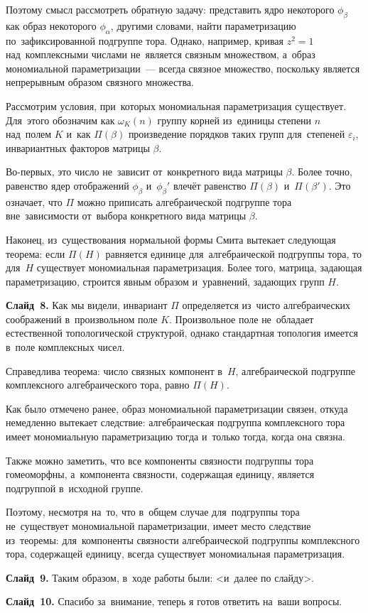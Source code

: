 \documentclass{article}
\begin{document}
  Поэтому смысл рассмотреть обратную задачу: представить ядро некоторого $\phi_\beta$ как образ некоторого $\phi_\alpha$,
  другими словами, найти параметризацию по~зафиксированной подгруппе тора. Однако, например, кривая $z^2 = 1$ над~комплексными числами
  не~является связным множеством, а~образ мономиальной параметризации~— всегда связное множество, поскольку является непрерывным
  образом связного множества.

  Рассмотрим условия, при~которых мономиальная параметризация существует. Для~этого обозначим как $\omega_K(n)$ группу корней из~единицы
  степени $n$ над~полем $K$ и~как $\Pi(\beta)$ произведение порядков таких групп для~степеней $\varepsilon_i$, инвариантных факторов матрицы $\beta$.

  Во-первых, это число не~зависит от~конкретного вида матрицы $\beta$. Более точно, равенство ядер отображений $\phi_\beta$ и~$\phi_\beta'$
  влечёт равенство $\Pi(\beta)$ и~$\Pi(\beta')$. Это означает, что $\Pi$ можно приписать алгебраической подгруппе тора вне~зависимости
  от~выбора конкретного вида матрицы $\beta$.

  Наконец, из~существования нормальной формы Смита вытекает следующая теорема: если $\Pi(H)$ равняется единице для~алгебраической подгруппы
  тора, то для~$H$ существует мономиальная параметризация. Более того, матрица, задающая параметризацию, строится явным образом и~уравнений,
  задающих групп $H$.

  \textbf{Слайд~8.} Как мы видели, инвариант $\Pi$ определяется из~чисто алгебраических соображений в~произвольном поле $K$.
  Произвольное поле не~обладает естественной топологической структурой, однако стандартная топология имеется в~поле комплексных чисел.

  Справедлива теорема: число связных компонент в~$H$, алгебраической подгруппе комплексного алгебраического тора, равно $\Pi(H)$.

  Как было отмечено ранее, образ мономиальной параметризации связен, откуда немедленно вытекает следствие:
  алгебраическая подгруппа комплексного тора имеет мономиальную параметризацию тогда и~только тогда,
  когда она связна.

  Также можно заметить, что все компоненты связности подгруппы тора гомеоморфны, а~компонента связности,
  содержащая единицу, является подгруппой в~исходной группе.

  Поэтому, несмотря на~то, что в~общем случае для~подгруппы тора не~существует мономиальной параметризации,
  имеет место следствие из~теоремы: для~компоненты связности алгебраической подгруппы комплексного тора, содержащей
  единицу, всегда существует мономиальная параметризация.

  \textbf{Слайд~9.} Таким образом, в~ходе работы были: <и~далее по слайду>.

  \textbf{Слайд~10.} Спасибо за~внимание, теперь я готов ответить на~ваши вопросы.
\end{document}
